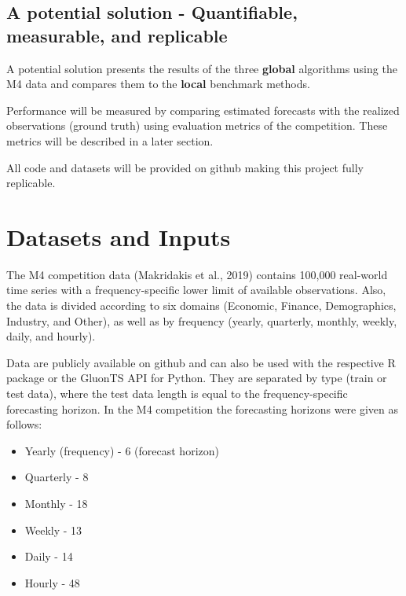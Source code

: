 \documentclass[11pt]{article}
\providecommand{\tightlist}{%
      \setlength{\itemsep}{0pt}\setlength{\parskip}{0pt}}
\begin{document}
\hypertarget{a-potential-solution---quantifiable-measurable-and-replicable}{%
\subsection{A potential solution - Quantifiable, measurable, and
replicable}\label{a-potential-solution---quantifiable-measurable-and-replicable}}

A potential solution presents the results of the three \textbf{global}
algorithms using the M4 data and compares them to the \textbf{local}
benchmark methods.

Performance will be measured by comparing estimated forecasts with the
realized observations (ground truth) using evaluation metrics of the
competition. These metrics will be described in a later section.

All code and datasets will be provided on github making this project
fully replicable.

    \hypertarget{datasets-and-inputs}{%
\section{Datasets and Inputs}\label{datasets-and-inputs}}

The M4 competition data (Makridakis et al., 2019) contains 100,000
real-world time series with a frequency-specific lower limit of
available observations. Also, the data is divided according to six
domains (Economic, Finance, Demographics, Industry, and Other), as well
as by frequency (yearly, quarterly, monthly, weekly, daily, and hourly).

Data are publicly available on github and can also be used with the
respective R package or the GluonTS API for Python. They are separated
by type (train or test data), where the test data length is equal to the
frequency-specific forecasting horizon. In the M4 competition the
forecasting horizons were given as follows:

\begin{itemize}
\tightlist
\item
  Yearly (frequency) - 6 (forecast horizon)
\item
  Quarterly - 8
\item
  Monthly - 18
\item
  Weekly - 13
\item
  Daily - 14
\item
  Hourly - 48
\end{itemize}
\end{document}
